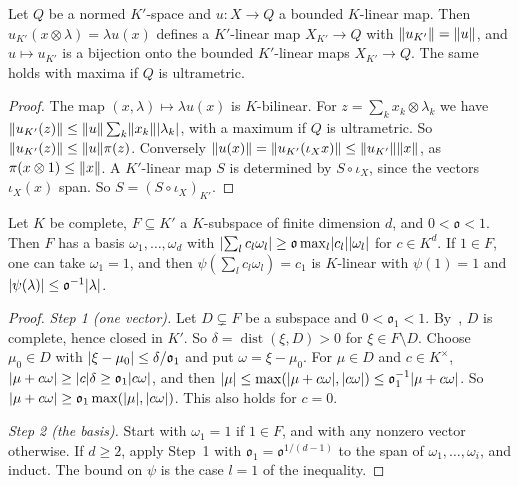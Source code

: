 \begin{lemma}\label{dp:bc:universal}
Let $Q$ be a normed $K'$-space and $u\colon X\to Q$ a bounded $K$-linear map. Then $u_{K'}(x\otimes\lambda)=\lambda u(x)$ defines a $K'$-linear map $X_{K'}\to Q$ with $\lVert u_{K'}\rVert=\lVert u\rVert$, and $u\mapsto u_{K'}$ is a bijection onto the bounded $K'$-linear maps $X_{K'}\to Q$. The same holds with maxima if $Q$ is ultrametric.
\end{lemma}

\begin{proof}
The map $(x,\lambda)\mapsto\lambda u(x)$ is $K$-bilinear. For $z=\sum_kx_k\otimes\lambda_k$ we have $\lVert u_{K'}(z)\rVert\le\lVert u\rVert\sum_k\lVert x_k\rVert\lvert \lambda_k\rvert$, with a maximum if $Q$ is ultrametric. So $\lVert u_{K'}(z)\rVert\le\lVert u\rVert\pi(z)$. Conversely $\lVert u(x)\rVert=\lVert u_{K'}(\iota_Xx)\rVert\le\lVert u_{K'}\rVert\lVert x\rVert$, as $\pi(x\otimes1)\le\lVert x\rVert$. A $K'$-linear map $S$ is determined by $S\circ\iota_X$, since the vectors $\iota_X(x)$ span. So $S=(S\circ\iota_X)_{K'}$.
\end{proof}

\begin{lemma}\label{dp:bc:orthogonal}
Let $K$ be complete, $F\subseteq K'$ a $K$-subspace of finite dimension $d$, and $0<\mathfrak o<1$. Then $F$ has a basis $\omega_1,\dots,\omega_d$ with $\lvert \sum_lc_l\omega_l\rvert\ge\mathfrak o\max_l\lvert c_l\rvert\lvert \omega_l\rvert$ for $c\in K^d$. If $1\in F$, one can take $\omega_1=1$, and then $\psi(\sum_lc_l\omega_l)=c_1$ is $K$-linear with $\psi(1)=1$ and $\lvert \psi(\lambda)\rvert\le\mathfrak o^{-1}\lvert \lambda\rvert$.
\end{lemma}

\begin{proof}
\emph{Step 1 (one vector).} Let $D\subsetneq F$ be a subspace and $0<\mathfrak o_1<1$. By~\cite[Lemma~A.3]{I}, $D$ is complete, hence closed in $K'$. So $\delta=\operatorname{dist}(\xi,D)>0$ for $\xi\in F\setminus D$. Choose $\mu_0\in D$ with $\lvert \xi-\mu_0\rvert\le\delta/\mathfrak o_1$ and put $\omega=\xi-\mu_0$. For $\mu\in D$ and $c\in K^\times$, $\lvert \mu+c\omega\rvert\ge\lvert c\rvert\delta\ge\mathfrak o_1\lvert c\omega\rvert$, and then $\lvert \mu\rvert\le\max(\lvert \mu+c\omega\rvert,\lvert c\omega\rvert)\le\mathfrak o_1^{-1}\lvert \mu+c\omega\rvert$. So $\lvert \mu+c\omega\rvert\ge\mathfrak o_1\max(\lvert \mu\rvert,\lvert c\omega\rvert)$. This also holds for $c=0$.

\emph{Step 2 (the basis).} Start with $\omega_1=1$ if $1\in F$, and with any nonzero vector otherwise. If $d\ge2$, apply Step~1 with $\mathfrak o_1=\mathfrak o^{1/(d-1)}$ to the span of $\omega_1,\dots,\omega_i$, and induct. The bound on $\psi$ is the case $l=1$ of the inequality.
\end{proof}

